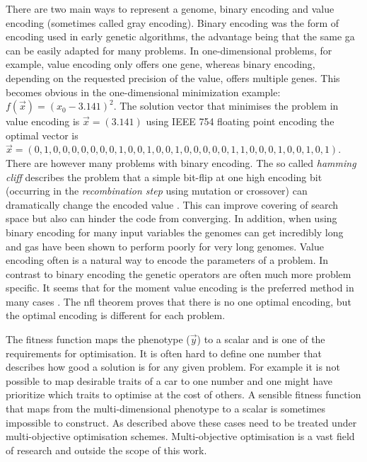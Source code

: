 There are two main ways to represent a \gls{genome}, binary encoding and value encoding (sometimes called gray encoding). Binary encoding was the form of encoding  used in early genetic algorithms, the advantage being that the same \gls{ga} can be easily adapted for many problems. In one-dimensional problems, for example, value encoding only offers one gene, whereas binary encoding, depending on the requested precision of the value, offers multiple genes. This becomes obvious in the one-dimensional minimization example: $f(\vec{x})=(x_0 - 3.141)^2$. The solution vector that minimises the problem in value encoding is $\vec{x} = (3.141)$ using IEEE 754 floating point encoding the optimal vector is $\vec{x}=(0,1,0,0,0,0,0,0,0,1,0,0,1,0,0,1,0,0,0,0,0,1,1,0,0,0,1,0,0,1,0,1)$.
There are however many problems with binary encoding. The so called \textit{hamming cliff} describes the problem that a simple bit-flip at one high encoding bit (occurring in the \textit{recombination step} using \gls{mutation} or \gls{crossover}) can dramatically change the encoded value \citep[e.g.][]{Chakraborty2003253}. This can improve covering of search space but also can hinder the code from converging. In addition, when using binary encoding for many input variables the genomes can get incredibly long and \glspl{ga} have been shown to perform poorly for very long genomes. Value encoding often is a natural way to encode the parameters of a problem. In contrast to binary encoding the genetic operators are often much more problem specific. It seems that for the moment value encoding is the preferred method in many cases \citep[e.g.][]{Janikow1991Comparison,Wright91geneticalgorithms,Goldberg90real-codedgenetic}. The \gls{nfl} theorem proves that there is no one optimal encoding, but the optimal encoding is different for each problem.

The fitness function maps the phenotype ($\vec{y}$) to a scalar and is one of the requirements for optimisation. It is often hard to define one number that describes how good a solution is for any given problem. For example it is not possible to map desirable traits of a car to one number and one might have prioritize which traits to optimise at the cost of others. A sensible \gls{fitness} function that maps from the multi-dimensional \gls{phenotype} to a scalar is sometimes impossible to construct. As described above these cases need to be treated under multi-objective optimisation schemes. Multi-objective optimisation is a vast field of research and outside the scope of this work. 

